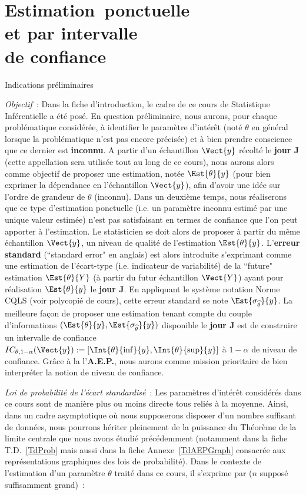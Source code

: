 \documentclass[10pt]{report}
\begin{document}
\chapter{\mbox{Estimation~ponctuelle}\\ et par intervalle\\ de confiance}\label{TdEst}
\begin{IndicList}{Indications préliminaires} 
\item \textit{Objectif}~: Dans la fiche d'introduction, le cadre de ce cours de Statistique Inférentielle a été posé. En question préliminaire, nous aurons, pour chaque problématique considérée, à identifier le paramètre d'intérêt (noté $\theta$ en général lorsque la problématique n'est pas encore précisée) et à bien prendre conscience que ce dernier est \textbf{inconnu}. A partir d'un échantillon $\Vect{y}$ récolté le \textbf{jour J} (cette appellation sera utilisée tout au long de ce cours), nous aurons alors comme objectif de proposer une estimation, notée $\Est{\theta}{y}$ (pour bien exprimer la dépendance en l'échantillon $\Vect{y}$), afin d'avoir une idée sur l'ordre de grandeur de $\theta$ (inconnu). Dans un deuxième temps, nous réaliserons que ce type d'estimation ponctuelle (i.e. un paramètre inconnu estimé par une unique valeur estimée) n'est pas satisfaisant en termes de confiance que l'on peut apporter à l'estimation. Le statisticien se doit alors de proposer à partir du même échantillon $\Vect{y}$, un niveau de qualité de l'estimation  $\Est{\theta}{y}$. L'\textbf{erreur standard} (``standard error" en anglais) est alors introduite s'exprimant comme une estimation de l'écart-type (i.e. indicateur de variabilité) de la ``future" estimation $\Est{\theta}{Y}$ (à partir du futur échantillon $\Vect{Y}$) ayant pour réalisation $\Est{\theta}{y}$ le \textbf{jour J}. En appliquant le système notation Norme CQLS (voir polycopié de cours), cette erreur standard se note $\Est{\sigma_{\widehat{\theta}}}{y}$.
La meilleure façon de proposer une estimation tenant compte du couple d'informations $(\Est{\theta}{y},\Est{\sigma_{\widehat{\theta}}}{y})$ disponible le \textbf{jour J} est de construire un intervalle de confiance $IC_{\theta,1-\alpha}(\Vect{y}):=[\Int{\theta}{\inf}{y},\Int{\theta}{\sup}{y}]$ à $1-\alpha$ de niveau de confiance. Grâce à la l'\textbf{A.E.P.}, nous aurons comme mission prioritaire de bien interpréter la notion de niveau de confiance. 
\item \textit{Loi de probabilité de l'écart standardisé}~: Les paramètres d'intérêt considérés dans ce cours sont de manière plus ou moins directe tous reliés à la moyenne. Ainsi, dans un cadre asymptotique où nous supposerons disposer d'un nombre suffisant de données, nous pourrons hériter pleinement de la puissance du Théorème de la limite centrale que nous avons étudié précédemment (notamment dans la fiche T.D.~\ref{TdProb} mais aussi dans la fiche Annexe~\ref{TdAEPGraph} consacrée aux représentations graphiques des lois de probabilité). Dans le contexte de l'estimation d'un paramètre $\theta$ traité dans ce cours, il s'exprime par ($n$ supposé suffisamment grand)~:

\end{IndicList}
\end{document}
